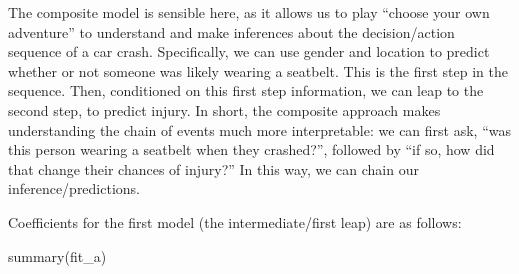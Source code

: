 \documentclass[
]{article}
\newenvironment{Shaded}{\begin{snugshade}}{\end{snugshade}}
\newcommand{\AttributeTok}[1]{\textcolor[rgb]{0.77,0.63,0.00}{#1}}
\newcommand{\CommentTok}[1]{\textcolor[rgb]{0.56,0.35,0.01}{\textit{#1}}}
\newcommand{\DecValTok}[1]{\textcolor[rgb]{0.00,0.00,0.81}{#1}}
\newcommand{\FloatTok}[1]{\textcolor[rgb]{0.00,0.00,0.81}{#1}}
\newcommand{\FunctionTok}[1]{\textcolor[rgb]{0.00,0.00,0.00}{#1}}
\newcommand{\NormalTok}[1]{#1}
\newcommand{\OtherTok}[1]{\textcolor[rgb]{0.56,0.35,0.01}{#1}}
\newcommand{\SpecialCharTok}[1]{\textcolor[rgb]{0.00,0.00,0.00}{#1}}
\newcommand{\StringTok}[1]{\textcolor[rgb]{0.31,0.60,0.02}{#1}}
\begin{document}
\begin{Shaded}
\end{Shaded}

The composite model is sensible here, as it allows us to play ``choose
your own adventure'' to understand and make inferences about the
decision/action sequence of a car crash. Specifically, we can use gender
and location to predict whether or not someone was likely wearing a
seatbelt. This is the first step in the sequence. Then, conditioned on
this first step information, we can leap to the second step, to predict
injury. In short, the composite approach makes understanding the chain
of events much more interpretable: we can first ask, ``was this person
wearing a seatbelt when they crashed?'', followed by ``if so, how did
that change their chances of injury?'' In this way, we can chain our
inference/predictions.

Coefficients for the first model (the intermediate/first leap) are as
follows:

\begin{Shaded}
\begin{Highlighting}[]
\FunctionTok{summary}\NormalTok{(fit\_a)}
\end{Highlighting}
\end{Shaded}
\end{document}
